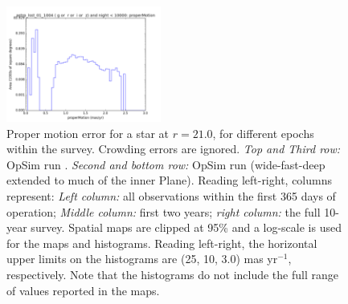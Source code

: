 \begin{figure}[ht]
\begin{center}
  \includegraphics[width=2.0in]{./figs/milkyway/astromPanels/MW_Astrom_pmError_wfdPlane_10y_hst.png}
  \end{center}
  \caption{Proper motion error for a star at $r=21.0$, for different epochs within the survey. Crowding errors are ignored. {\it Top and Third row:} OpSim run .  {\it Second and bottom row:} OpSim run  (wide-fast-deep extended to much of the inner Plane). Reading left-right, columns represent: {\it Left column:} all observations within the first 365 days of operation; {\it Middle column:} first two years; {\it right column:} the full 10-year survey. Spatial maps are clipped at 95\% and a log-scale is used for the maps and histograms. Reading left-right, the horizontal upper limits on the histograms are (25, 10, 3.0) mas yr$^{-1}$, respectively. Note that the histograms do not include the full range of values reported in the maps.}
  \label{fig_astrom_ByTime_pmError}
\end{figure}


